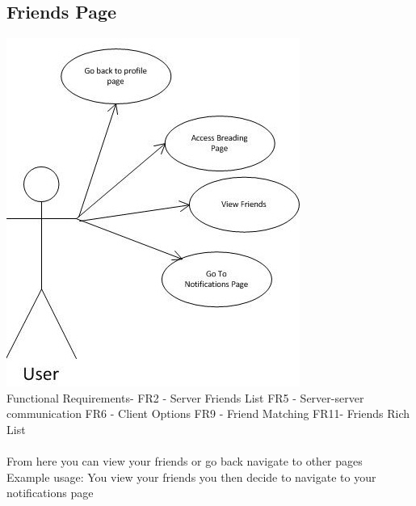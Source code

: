 \documentclass{project}
\begin{document}
\subsection{Friends Page}
\includegraphics[scale=0.6]{FriendsPageUseCase.jpg}
\\
Functional Requirements-
FR2 - Server Friends List
FR5 - Server-server communication
FR6 - Client Options
FR9 - Friend Matching
FR11- Friends Rich List
\\
\\
From here you can view your friends or go back navigate to other pages
\\
Example usage: You view your friends you then decide to navigate to your notifications page

\newpage
\end{document}
